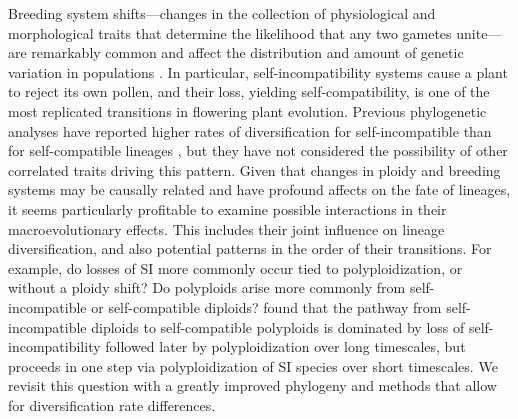 Breeding system shifts---changes in the collection of physiological and morphological traits that determine the likelihood that any two gametes unite---are remarkably common and affect the distribution and amount of genetic variation in populations \citep{stebbins1974, barrett2013}.
In particular, self-incompatibility systems cause a plant to reject its own pollen, and their loss, yielding self-compatibility, is one of the most replicated transitions in flowering plant evolution. %
Previous phylogenetic analyses have reported higher rates of diversification for self-incompatible than for self-compatible lineages \citep{goldberg_2010, devos2014}, but they have not considered the possibility of other correlated traits driving this pattern.
Given that changes in ploidy and breeding systems may be causally related and have profound affects on the fate of lineages, it seems particularly profitable to examine possible interactions in their macroevolutionary effects.
This includes their joint influence on lineage diversification, and also potential patterns in the order of their transitions.
For example, do losses of SI more commonly occur tied to polyploidization, or without a ploidy shift?
Do polyploids arise more commonly from self-incompatible or self-compatible diploids?
 found that the pathway from self-incompatible diploids to self-compatible polyploids is dominated by loss of self-incompatibility followed later by polyploidization over long timescales, but proceeds in one step via polyploidization of SI species over short timescales.
We revisit this question with a greatly improved phylogeny and methods that allow for diversification rate differences. %


